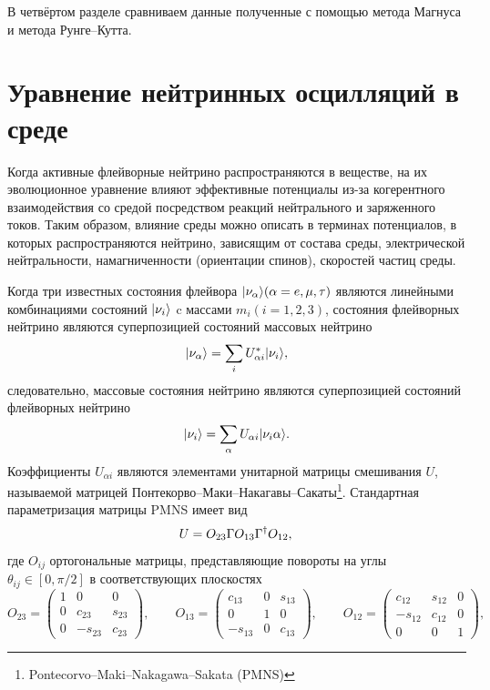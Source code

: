 \documentclass[a4paper,12pt]{article}
\DeclarePairedDelimiter\ket{|}{\rangle}
\begin{document}
В четвёртом разделе сравниваем данные полученные с помощью метода Магнуса и метода Рунге--Кутта.


	\newpage
	\section{Уравнение нейтринных осцилляций в среде}
	Когда активные флейворные нейтрино распространяются в веществе, на их
	эволюционное уравнение влияют эффективные потенциалы из-за когерентного
	взаимодействия со средой посредством реакций нейтрального и заряженного
	токов. Таким образом, влияние среды можно описать в терминах потенциалов, в
	которых распространяются нейтрино, зависящим от состава среды, электрической
	нейтральности, намагниченности (ориентации спинов), скоростей частиц среды.

	Когда три известных состояния флейвора \(\ket{\nu_{\alpha}} (\alpha= e, \mu, \tau)\) являются линейными комбинациями состояний \(\ket{\nu_{i}}\) c массами \(m_{i} (i=1,2,3)\), состояния флейворных нейтрино являются суперпозицией состояний
	массовых нейтрино
	\begin{equation}\label{eq:11}
		\ket{\nu_{\alpha}}=\sum_{i}U_{\alpha i}^{*}\ket{\nu_{i}},
	\end{equation}
	следовательно, массовые состояния нейтрино являются суперпозицией состояний флейворных нейтрино
	\begin{equation}\label{eq:11a}
		\ket{\nu_{i}}=\sum_{\alpha}U_{\alpha i}\ket{\nu_{i}{\alpha}}.
	\end{equation}
	Коэффициенты \(U_{\alpha i}\) являются элементами унитарной матрицы
	смешивания \(U\), называемой матрицей
	Понтекорво--Маки--Накагавы--Сакаты\footnote{Pontecorvo--Maki--Nakagawa--Sakata
	(PMNS)}. Стандартная параметризация матрицы PMNS имеет вид
	\begin{equation}
		U=O_{23}\Gamma O_{13}\Gamma^{\dagger}O_{12},\\
	\end{equation}
	где \(O_{ij}\) ортогональные матрицы, представляющие повороты на углы \(\theta_{ij}\in[0, \pi/2]\) в соответствующих плоскостях
	\begin{equation}
  		O_{23}=
  		\begin{pmatrix}
  			1 & 0 & 0\\
  			0 & c_{23} & s_{23}\\
  			0 & -s_{23} & c_{23}
  		\end{pmatrix},
		\qquad O_{13}=
  		\begin{pmatrix}
  			c_{13} & 0 & s_{13}\\
  			0 & 1 & 0\\
  			-s_{13} &0 & c_{13}
  		\end{pmatrix},
		\qquad O_{12}=
  		\begin{pmatrix}
  			c_{12} & s_{12} & 0\\
  			-s_{12} & c_{12} & 0\\
  			0 & 0 & 1
  		\end{pmatrix},
	\end{equation}
\end{document}
